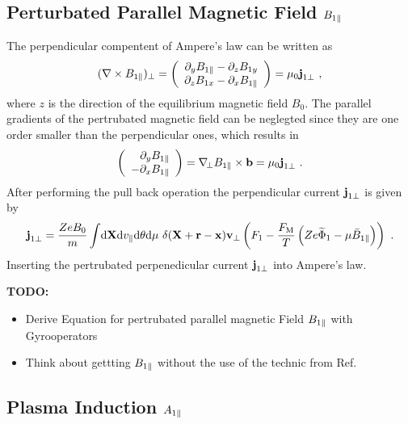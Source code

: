 \newpage

\subsection{Perturbated Parallel Magnetic Field $B_{1\parallel}$}
\label{sub:fieldMagnetic}

The perpendicular compentent of Ampere's law can be written as 
\begin{gather}
	(\nabla \times B_{1\parallel})_\perp = \left( \begin{array}{c} \partial_y B_{1\parallel} - \partial_z B_{1 y} \\ \partial_z B_{1x} - \partial_x B_{1\parallel} \end{array} \right) = \mu_0 \boldsymbol{\mathbf{j}}_{1 \perp}~,
	\label{eq:perpendicularAmpereLaw}
\end{gather}
where $z$ is the direction of the equilibrium magnetic field $B_0$. The parallel gradients of the pertrubated magnetic field can be neglegted since they are one order smaller than the perpendicular ones, which results in
\begin{gather}
	\left( \begin{array}{r} \partial_y B_{1\parallel} \\ - \partial_x B_{1\parallel} \end{array} \right) = \nabla_{\!\perp} B_{1\parallel} \times \boldsymbol{\mathbf{b}} = \mu_0 \boldsymbol{\mathbf{j}}_{1 \perp}~.
\end{gather}
After performing the pull back operation the perpendicular current $\boldsymbol{\mathbf{j}}_{1\perp}$ is given by 
\begin{gather}
		\boldsymbol{\mathbf{j}}_{1\perp} = \frac{Ze B_0}{m} \int \! \mathrm{d}\boldsymbol{\mathbf{X}}\mathrm{d}v_\parallel\mathrm{d}\theta\mathrm{d}\mu ~ \delta(\boldsymbol{\mathbf{X}} + \boldsymbol{\mathbf{r}} - \boldsymbol{\mathbf{x}}) \boldsymbol{\mathbf{v}}_\perp \left(F_1 - \frac{F_\mathrm{M}}{T}\left(Ze \widetilde{\Phi}_1 - \mu \bar{B}_{1\parallel}\right) \right) ~.
	\label{eq:perpendicularCurrentPullback}
\end{gather}
Inserting the pertrubated perpenedicular current $\boldsymbol{\mathbf{j}}_{1 \perp}$ into Ampere's law.

\textbf{TODO:}
\begin{itemize}
	\item Derive Equation for pertrubated parallel magnetic Field $B_{1\parallel}$ with Gyrooperators
	\item Think about gettting $B_{1\parallel}$ without the use of the technic from Ref. 
\end{itemize}

\newpage

\subsection{Plasma Induction $A_{1\parallel}$}
\label{sub:fieldInduction}

